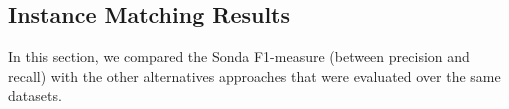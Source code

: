 \subsection{Instance Matching Results} 

In this section, we compared the Sonda F1-measure (between precision and recall) with the other alternatives approaches that were evaluated over the same datasets.



 

 